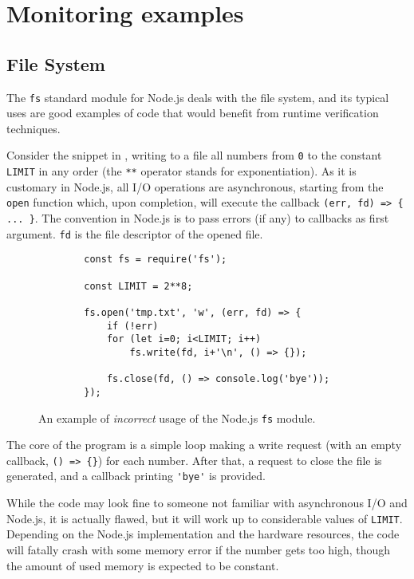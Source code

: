 \section{Monitoring examples}
\label{sec:examples}
\subsection{File System}
The \lstinline{fs} standard module for Node.js deals with the file system, and its typical uses are good examples of code that would benefit from runtime verification techniques.

Consider the snippet in , writing to a file all numbers from \lstinline{0} to the constant \lstinline{LIMIT} in any order (the \lstinline{**} operator stands for exponentiation).
As it is customary in Node.js, all I/O operations are asynchronous, starting from the \lstinline{open} function which, upon completion, will execute the callback \lstinline!(err, fd) => { ... }!.
The convention in Node.js is to pass errors (if any) to callbacks as first argument.
\lstinline{fd} is the file descriptor of the opened file.

\begin{figure}[h]
	\begin{lstlisting}
		const fs = require('fs');
		
		const LIMIT = 2**8;
		
		fs.open('tmp.txt', 'w', (err, fd) => {
			if (!err)
			for (let i=0; i<LIMIT; i++)
				fs.write(fd, i+'\n', () => {});
			
			fs.close(fd, () => console.log('bye'));
		});
	\end{lstlisting}
	\caption{An example of \emph{incorrect} usage of the Node.js \lstinline{fs} module.}
	\label{lst:fs}
\end{figure}

The core of the program is a simple loop making a write request (with an empty callback, \lstinline!() => {}!) for each number.
After that, a request to close the file is generated, and a callback printing \lstinline{'bye'} is provided.

While the code may look fine to someone not familiar with asynchronous I/O and Node.js, it is actually flawed, but it will work up to considerable values of \lstinline{LIMIT}.
Depending on the Node.js implementation and the hardware resources, the code will fatally crash with some memory error if the number gets too high, though the amount of used memory is expected to be constant.

